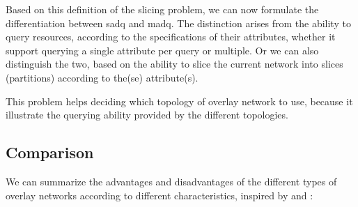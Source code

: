 \documentclass[12pt, titlepage]{uo_temp}
\begin{document}
     Based on this definition of the slicing problem, we can now formulate the
     differentiation between \gls{sadq} and \gls{madq}. The distinction arises from the
     ability to query resources, according to the specifications of their attributes,
     whether it support querying a single attribute per query or multiple. Or we can also
     distinguish the two, based on the ability to slice the current network into slices
     (partitions) according to the(se) attribute(s).

     This problem helps deciding which topology of overlay network to use, because it
     illustrate the querying ability provided by the different topologies.

     \clearpage
     \subsection{Comparison}
     We can summarize the advantages and disadvantages of the different types of overlay
     networks according to different characteristics, inspired by \cite{lua2005survey} and
     \cite{p2p_collab}:
\end{document}
